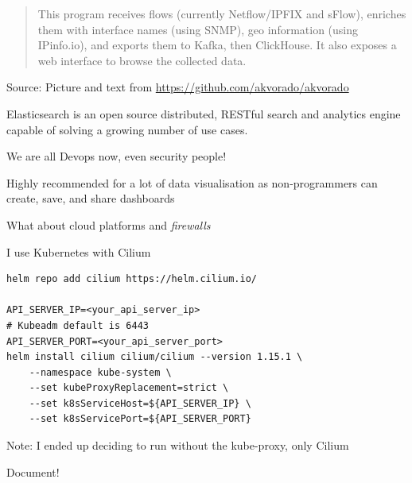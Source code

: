 \documentclass[Screen16to9,17pt]{foils}
\begin{document}
\begin{quote}
This program receives flows (currently Netflow/IPFIX and sFlow), enriches them with interface names (using SNMP), geo information (using IPinfo.io), and exports them to Kafka, then ClickHouse. It also exposes a web interface to browse the collected data.
\end{quote}
Source: Picture and text from \url{https://github.com/akvorado/akvorado}




Elasticsearch is an open source distributed, RESTful search and analytics engine capable of solving a growing number of use cases.


\centerline{We are all Devops now, even security people!}

Highly recommended for a lot of data visualisation as non-programmers can create, save, and share dashboards



What about cloud platforms and \emph{firewalls}

I use Kubernetes with Cilium

\begin{verbatim}
helm repo add cilium https://helm.cilium.io/

API_SERVER_IP=<your_api_server_ip>
# Kubeadm default is 6443
API_SERVER_PORT=<your_api_server_port>
helm install cilium cilium/cilium --version 1.15.1 \
    --namespace kube-system \
    --set kubeProxyReplacement=strict \
    --set k8sServiceHost=${API_SERVER_IP} \
    --set k8sServicePort=${API_SERVER_PORT}
\end{verbatim}

\begin{list2}
\item Note: I ended up deciding to run without the kube-proxy, only Cilium
\item Document!
\end{list2}



\end{document}
